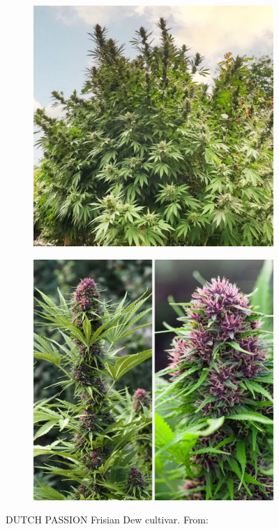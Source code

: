 \begin{figure}[htbp]
    \begin{subfigure}[t]{.48\textwidth}
        \includegraphics[width=\linewidth]{DUTCH-PASSION_Frisian-Dew_1}
        \label{fig:cannabis_frisian-dew_1}
    \end{subfigure}
    \begin{subfigure}[t]{.48\textwidth}
        \includegraphics[width=\linewidth]{DUTCH-PASSION_Frisian-Dew_2}
        \label{fig:cannabis_frisian-dew_2}
    \end{subfigure}
    \caption[DUTCH PASSION Frisian Dew]{DUTCH PASSION Frisian Dew cultivar. From: }
    \label{fig:cannabis_frisian-dew}
\end{figure}

